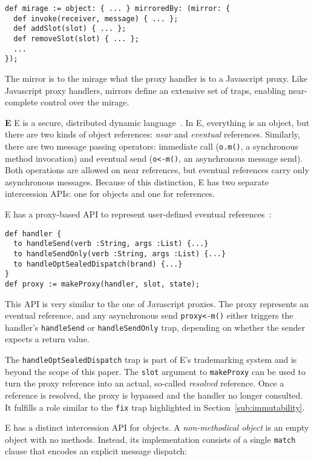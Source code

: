 \documentclass{acm_proc_article-sp}
\begin{document}
\begin{lstlisting}[]
def mirage := object: { ... } mirroredBy: (mirror: {
  def invoke(receiver, message) { ... };
  def addSlot(slot) { ... };
  def removeSlot(slot) { ... };
  ...
});
\end{lstlisting}

The mirror is to the mirage what the proxy handler is to a Javascript proxy. Like Javascript proxy handlers, mirrors define an extensive set of traps, enabling near-complete control over the mirage.

\textbf{E} E is a secure, distributed dynamic language~\cite{miller05strangers}. In E, everything is an object, but there are two kinds of object references: \emph{near} and \emph{eventual} references. Similarly, there are two message passing operators: immediate call (\texttt{o.m()}, a synchronous method invocation) and eventual send (\texttt{o<-m()}, an asynchronous message send). Both operations are allowed on near references, but eventual references carry only asynchronous messages. Because of this distinction, E has two separate intercession APIs: one for objects and one for references.

E has a proxy-based API to represent user-defined eventual references~\cite{e_wiki}:
\begin{lstlisting}[]
def handler {
  to handleSend(verb :String, args :List) {...}
  to handleSendOnly(verb :String, args :List) {...}
  to handleOptSealedDispatch(brand) {...}
}
def proxy := makeProxy(handler, slot, state);
\end{lstlisting}

This API is very similar to the one of Javascript proxies. The proxy represents an eventual reference, and any asynchronous send \texttt{proxy<-m()} either triggers the handler's \texttt{handleSend} or \texttt{handleSendOnly} trap, depending on whether the sender expects a return value.

The \texttt{handleOptSealedDispatch} trap is part of E's trademarking system and is beyond the scope of this paper. The \texttt{slot} argument to \texttt{makeProxy} can be used to turn the proxy reference into an actual, so-called \emph{resolved} reference. Once a reference is resolved, the proxy is bypassed and the handler no longer consulted. It fulfills a role similar to the \texttt{fix} trap highlighted in Section~\ref{sub:immutability}.

E has a distinct intercession API for objects. A \emph{non-methodical object} is an empty object with no methods. Instead, its implementation consists of a single \texttt{match} clause that encodes an explicit message dispatch:
\end{document}
